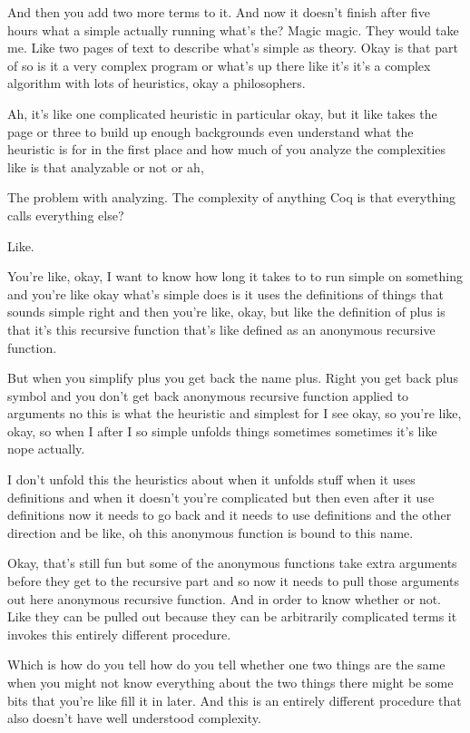 \begin{subappendices}
    And then you add two more terms to it. And now it doesn't finish after five hours what a simple actually running what's the? Magic magic. They would take me. Like two pages of text to describe what's simple as theory. Okay is that part of so is it a very complex program or what's up there like it's it's a complex algorithm with lots of heuristics, okay a philosophers. 
    
    Ah, it's like one complicated heuristic in particular okay, but it like takes the page or three to build up enough backgrounds even understand what the heuristic is for in the first place and how much of you analyze the complexities like is that analyzable or not or ah, 
    
    The problem with analyzing. The complexity of anything Coq is that everything calls everything else? 
    
    Like. 
    
    You're like, okay, I want to know how long it takes to to run simple on something and you're like okay what's simple does is it uses the definitions of things that sounds simple right and then you're like, okay, but like the definition of plus is that it's this recursive function that's like defined as an anonymous recursive function. 
    
    But when you simplify plus you get back the name plus. Right you get back plus symbol and you don't get back anonymous recursive function applied to arguments no this is what the heuristic and simplest for I see okay, so you're like, okay, so when I after I so simple unfolds things sometimes sometimes it's like nope actually. 
    
    I don't unfold this the heuristics about when it unfolds stuff when it uses definitions and when it doesn't you're complicated but then even after it use definitions now it needs to go back and it needs to use definitions and the other direction and be like, oh this anonymous function is bound to this name. 
    
    Okay, that's still fun but some of the anonymous functions take extra arguments before they get to the recursive part and so now it needs to pull those arguments out here anonymous recursive function. And in order to know whether or not. Like they can be pulled out because they can be arbitrarily complicated terms it invokes this entirely different procedure. 
    
    Which is how do you tell how do you tell whether one two things are the same when you might not know everything about the two things there might be some bits that you're like fill it in later. And this is an entirely different procedure that also doesn't have well understood complexity. 
    

\end{subappendices}
